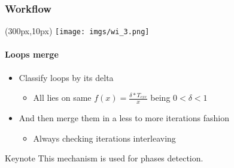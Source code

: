 \documentclass{beamer}
\begin{document}
\begin{frame}
\frametitle{Workflow}
\begin{textblock*}{5cm}(300px,10px) %
	\texttt{[image: imgs/wi\_3.png]}
\end{textblock*}
\framesubtitle{Loops merge}
\begin{itemize}
	\pause
	\item Classify loops by its delta
	\begin{itemize}
		\item All lies on same $f(x)=\frac{\delta*T_{exe}}{x}$ being $0 < \delta < 1$
	\end{itemize}
	\item And then merge them in a less to more iterations fashion
	\begin{itemize}
		\item Always checking iterations interleaving
	\end{itemize}
\end{itemize}
\pause
\pause
\begin{block}{Keynote}
	This mechanism is used for phases detection.
\end{block}
\end{frame}
\end{document}
